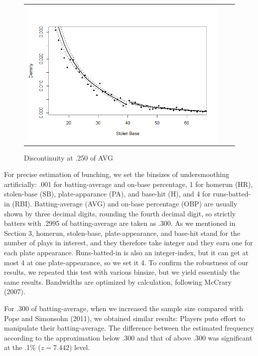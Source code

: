 \documentclass[dvipdfmx, 12pt]{article}
\begin{document}
\begin{figure}
\begin{tabular}{ccc}
{\begin{minipage}{.4\textwidth}
      \includegraphics[keepaspectratio, scale = 0.5, angle = 0]{graphs/SB_40.png}
      \caption{Discontinuity at .250 of AVG}
      \label{DCdensity_SB_40}
    \end{minipage}
    }
  \end{tabular}
\end{figure}

For precise estimation of bunching, we set the binsizes of undersmoothing artificially: .001 for batting-average and on-base percentage, 1 for homerun (HR), stolen-base (SB), plate-apparance (PA), and base-hit (H), and 4 for runs-batted-in (RBI). Batting-average (AVG) and on-base percentage (OBP) are usually shown by three decimal digits, rounding the fourth decimal digit, so strictly batters with .2995 of batting-average are taken as .300. As we mentioned in Section 3, homerun, stolen-base, plate-appearance, and base-hit stand for the number of plays in interest, and they therefore take integer and they earn one for each plate appearance. Runs-batted-in is also an integer-index, but it can get at most 4 at one plate-appearance, so we set it 4. To confirm the robustness of our results, we repeated this test with various binsize, but we yield essentialy the same results. Bandwidths are optimized by calculation, following McCrary (2007).

For .300 of batting-average, when we increased the sample size compared with Pope and Simonsohn (2011), we obtained similar results: Players puto effort to manipulate their batting-average. The difference between the estimated frequency according to the approximation below .300 and that of above .300 was significant at the .1\% ($z=7.442$) level.
\end{document}

